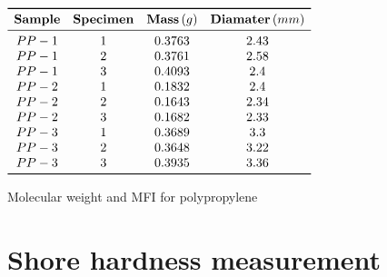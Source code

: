 \documentclass[a4paper, 11pt]{article}
\begin{document}
\begin{appendices}
\begin{table}[htp]
	\centering
	$
	\begin{array}{cccc}
	\toprule
	\textbf{Sample} & \textbf{Specimen} & \textbf{Mass}\, (g) & \textbf{Diamater}\, (mm)\\
	\midrule
	PP-1 & 1 & 0.3763 & 2.43\\
	PP-1 & 2 & 0.3761 & 2.58\\
	PP-1 & 3 & 0.4093 & 2.4\\
	PP-2 & 1 & 0.1832 & 2.4\\
	PP-2 & 2 & 0.1643 & 2.34\\
	PP-2 & 3 & 0.1682 & 2.33\\
	PP-3 & 1 & 0.3689 & 3.3\\
	PP-3 & 2 & 0.3648 & 3.22\\
	PP-3 & 3 & 0.3935 & 3.36\\
	\bottomrule
	\end{array}
	$
	\caption{Molecular weight and MFI for polypropylene}
	\label{tab:tmwpp}
\end{table}

\section{Shore hardness measurement}


\end{appendices}
\end{document}
